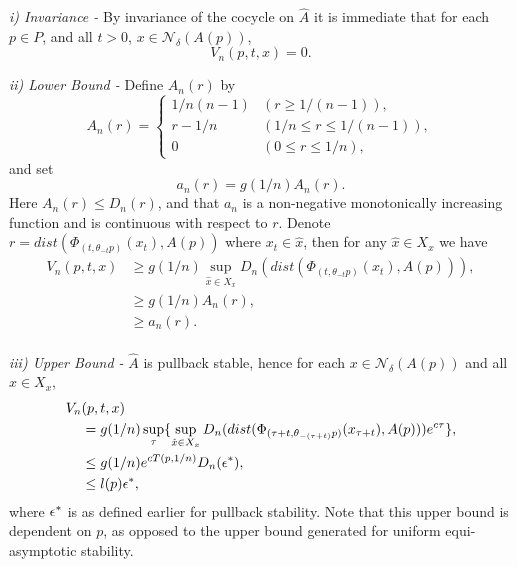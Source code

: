 \begin{prf}
{\em i) Invariance - } By invariance of the cocycle on $\hat{A}$
it is immediate that for each $p \in P$, and all $t > 0$, $x \in
\mathcal{N}_{\delta} (A(p))$,
\begin{equation*}
  V_n(p, t, x) = 0.
\end{equation*}

  {\em ii) Lower Bound -} Define $A_n(r)$ by
  \begin{equation*}
  A_n( r ) = \begin{cases}
  1/n(n-1) & (r \geq 1/(n-1) ), \\
  r - 1/n & ( 1/n \leq r \leq 1/(n-1) ), \\
  0 & ( 0 \leq r \leq 1/n ),
  \end{cases}
  \end{equation*}
  and set
  \[ a_n(r) = g(1/n) A_n(r). \]
  Here $A_n(r) \leq D_n(r)$, and that $a_n$ is a non-negative
  monotonically increasing function and is continuous with respect to $r$.
  Denote $r = dist( \Phi_{(t,
  \theta_{-t}p)}(x_t), A(p) )$ where $x_t \in
  \hat{x}$, then for any $\hat{x} \in X_x$ we have
  \begin{align*}
  V_n(p, t, x) &\geq g(1/n) \sup_{\hat{x} \in X_x} D_n( dist( \Phi_{(t,
    \theta_{-t}p)}(x_t), A(p) ) ), \\
  &\geq g(1/n) A_n(r), \\
  &\geq a_n(r). \\
  \end{align*}

  {\em iii) Upper Bound -} $\hat{A}$ is pullback stable, hence for each $x
  \in \mathcal{N}_{\delta}(A(p))$ and all $\hat{x} \in X_x$,
  \begin{align*}
    V_n&(p, t, x) \\
     & =g(1/n) \sup_{\tau} \{ \sup_{\hat{x} \in X_x}
        D_n(dist(\Phi_{(\tau+t, \theta_{-(\tau+t)} p)}(x_{\tau+t}),A(p)))
        e^{c\tau} \},  \\
    & \leq g(1/n) e^{cT(p, 1/n)} D_n( \epsilon^*), \\
    &\leq l(p) \epsilon^*,
  \end{align*}
  where $\epsilon^*$ is as defined earlier for pullback stability. Note that this
  upper bound is dependent on $p$, as opposed to the upper bound generated for
  uniform equi-asymptotic stability.


\end{prf}
